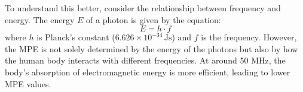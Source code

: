 To understand this better, consider the relationship between frequency and energy. The energy \(E\) of a photon is given by the equation:
\[
E = h \cdot f
\]
where \(h\) is Planck's constant (\(6.626 \times 10^{-34} \, \text{Js}\)) and \(f\) is the frequency. However, the MPE is not solely determined by the energy of the photons but also by how the human body interacts with different frequencies. At around 50 MHz, the body's absorption of electromagnetic energy is more efficient, leading to lower MPE values.

